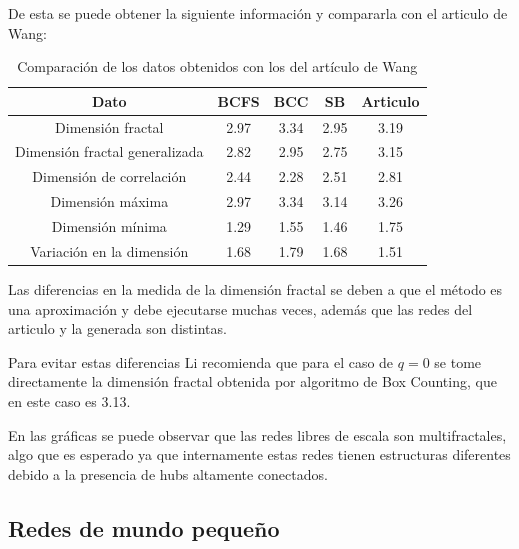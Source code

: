 De esta se puede obtener la siguiente información y compararla con el articulo de Wang\cite{Wang2012}:

\begin{table}[H]
    \centering
    \begin{tabular}{|c|c|c|c|c|}
        \hline
         \textbf{Dato}& \textbf{BCFS} & \textbf{BCC} & \textbf{SB} & \textbf{Articulo} \\
         \hline
         Dimensión fractal & 2.97 & 3.34 & 2.95 & 3.19 \\
         \hline
         Dimensión fractal generalizada & 2.82 & 2.95 & 2.75 &3.15  \\
         \hline
         Dimensión de correlación & 2.44 & 2.28 & 2.51 &2.81 \\
         \hline
         Dimensión máxima & 2.97 & 3.34 & 3.14 &3.26 \\
         \hline
         Dimensión mínima & 1.29 & 1.55 & 1.46 &1.75 \\
         \hline
         Variación en la dimensión & 1.68 & 1.79 & 1.68 &1.51 \\
         \hline
    \end{tabular}
    \caption{Comparación de los datos obtenidos con los del artículo de Wang\cite{Wang2012}}
\end{table}

Las diferencias en la medida de la dimensión fractal se deben a que el método es una aproximación y debe ejecutarse muchas veces, además que las redes del articulo y la generada son distintas.

Para evitar estas diferencias Li\cite{Li2014} recomienda que para el caso de $q=0$ se tome directamente la dimensión fractal obtenida por algoritmo de Box Counting, que en este caso es 3.13.

En las gráficas se puede observar que las redes libres de escala son multifractales, algo que es esperado ya que internamente estas redes tienen estructuras diferentes debido a la presencia de hubs altamente conectados.

\subsection{Redes de mundo pequeño}

